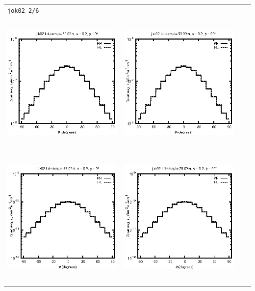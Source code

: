 \begin{tabular}{c c c c}
\multicolumn{4}{l}{\texttt{jok02 2/6}} \\
\includegraphics[height=7cm]{../eps/jok02_Ld_sample_50.00m_fwd.eps} &
\includegraphics[height=7cm]{../eps/jok02_Ld_sample_50.00m_cross.eps} \\
\includegraphics[height=7cm]{../eps/jok02_Ld_sample_75.00m_fwd.eps} &
\includegraphics[height=7cm]{../eps/jok02_Ld_sample_75.00m_cross.eps} \\

\end{tabular}
